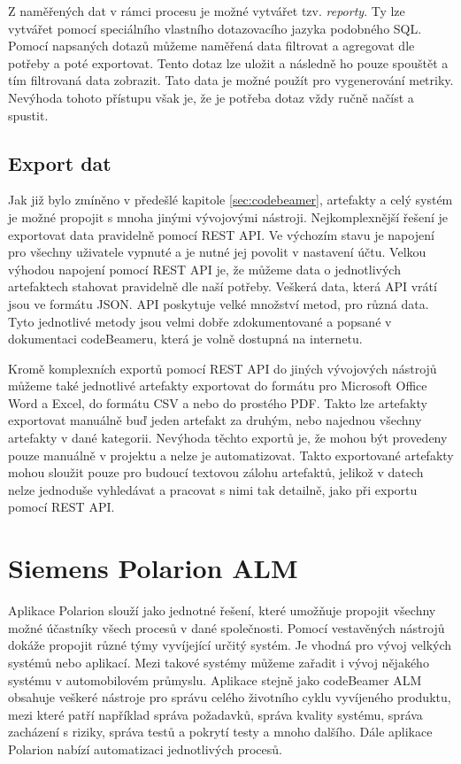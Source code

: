 \documentclass[czech,master]{diploma}
\begin{document}
Z naměřených dat v rámci procesu je možné vytvářet tzv. \textit{reporty}. Ty lze vytvářet pomocí speciálního vlastního dotazovacího jazyka podobného SQL. Pomocí napsaných dotazů můžeme naměřená data filtrovat a agregovat dle potřeby a poté exportovat. Tento dotaz lze uložit a následně ho pouze spouštět a tím filtrovaná data zobrazit. Tato data je možné použít pro vygenerování metriky. Nevýhoda tohoto přístupu však je, že je potřeba dotaz vždy ručně načíst a spustit.

\subsection{Export dat}
Jak již bylo zmíněno v předešlé kapitole \ref{sec:codebeamer}, artefakty a celý systém je možné propojit s mnoha jinými vývojovými nástroji. Nejkomplexnější řešení je exportovat data pravidelně pomocí REST API. Ve výchozím stavu je napojení pro všechny uživatele vypnuté a je nutné jej povolit v nastavení účtu. Velkou výhodou napojení pomocí REST API je, že můžeme data o jednotlivých artefaktech stahovat pravidelně dle naší potřeby. Veškerá data, která API vrátí jsou ve formátu JSON. API poskytuje velké množství metod, pro různá data. Tyto jednotlivé metody jsou velmi dobře zdokumentované a popsané v dokumentaci codeBeameru, která je volně dostupná na internetu.  \cite{ref:codebeamer_rest}

Kromě komplexních exportů pomocí REST API do jiných vývojových nástrojů můžeme také jednotlivé artefakty exportovat do formátu pro Microsoft Office Word a Excel, do formátu CSV a nebo do prostého PDF. Takto lze artefakty exportovat manuálně buď jeden artefakt za druhým, nebo najednou všechny artefakty v dané kategorii. Nevýhoda těchto exportů je, že mohou být provedeny pouze manuálně v projektu a nelze je automatizovat. Takto exportované artefakty mohou sloužit pouze pro budoucí textovou zálohu artefaktů, jelikož v datech nelze jednoduše vyhledávat a pracovat s nimi tak detailně, jako při exportu pomocí REST API.


\section{Siemens Polarion ALM}
Aplikace Polarion slouží jako jednotné řešení, které umožňuje propojit všechny možné účastníky všech procesů v dané společnosti. Pomocí vestavěných nástrojů dokáže propojit různé týmy vyvíjející určitý systém. Je vhodná pro vývoj velkých systémů nebo aplikací. Mezi takové systémy můžeme zařadit i vývoj nějakého systému v automobilovém průmyslu. Aplikace stejně jako codeBeamer ALM obsahuje veškeré nástroje pro správu celého životního cyklu vyvíjeného produktu, mezi které patří například správa požadavků, správa kvality systému, správa zacházení s riziky, správa testů a pokrytí testy a mnoho dalšího. Dále aplikace Polarion nabízí automatizaci jednotlivých procesů. \cite{ref:polarion_about}
\end{document}
